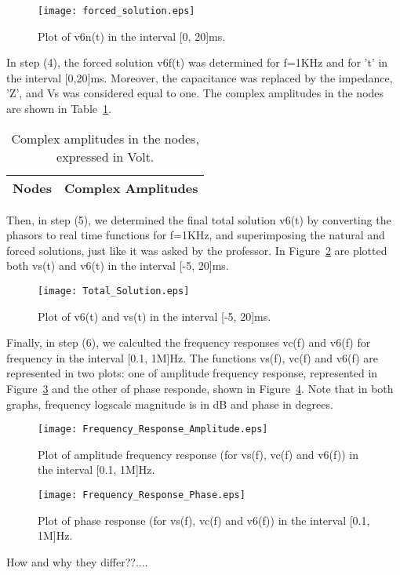 \begin{figure}[h] \centering
\texttt{[image: forced\_solution.eps]}
\caption{Plot of v6n(t) in the interval [0, 20]ms.}
\label{fig:plotA(4)}
\end{figure}

In step (4), the forced solution v6f(t) was determined for f=1KHz and for 't' in the interval [0,20]ms. Moreover, the capacitance was replaced by the impedance, 'Z', and Vs was considered equal to one. The complex amplitudes in the nodes are shown in Table~\ref{tab:TA4}.

\begin{table}[h]
  \centering
  \begin{tabular}{|l|r|}
    \hline    
    {\bf Nodes} & {\bf Complex Amplitudes} \\ \hline
    
  \end{tabular}
  \caption{Complex amplitudes in the nodes, expressed in Volt.}
  \label{tab:TA4}
\end{table}

Then, in step (5), we determined the final total solution v6(t) by converting the phasors to real time functions for f=1KHz, and superimposing the natural and forced solutions, just like it was asked by the professor. In Figure~\ref{fig:plotA(5)} are plotted both vs(t) and v6(t) in the interval [-5, 20]ms.

\begin{figure}[h] \centering
\texttt{[image: Total\_Solution.eps]}
\caption{Plot of v6(t) and vs(t) in the interval [-5, 20]ms.}
\label{fig:plotA(5)}
\end{figure}

Finally, in step (6), we calculted the frequency responses vc(f) and v6(f) for frequency in the interval [0.1, 1M]Hz. The functions vs(f), vc(f) and v6(f) are represented in two plots: one of amplitude frequency response, represented in Figure~\ref{fig:plotA(61)} and the other of phase responde, shown in Figure~\ref{fig:plotA(62)}. Note that in both graphs, frequency logscale magnitude is in dB and phase in degrees.

\begin{figure}[h] \centering
\texttt{[image: Frequency\_Response\_Amplitude.eps]}
\caption{Plot of amplitude frequency response (for vs(f), vc(f) and v6(f)) in the interval [0.1, 1M]Hz.}
\label{fig:plotA(61)}
\end{figure}

\begin{figure}[h] \centering
\texttt{[image: Frequency\_Response\_Phase.eps]}
\caption{Plot of phase response (for vs(f), vc(f) and v6(f)) in the interval [0.1, 1M]Hz.}
\label{fig:plotA(62)}
\end{figure}

How and why they differ??....
